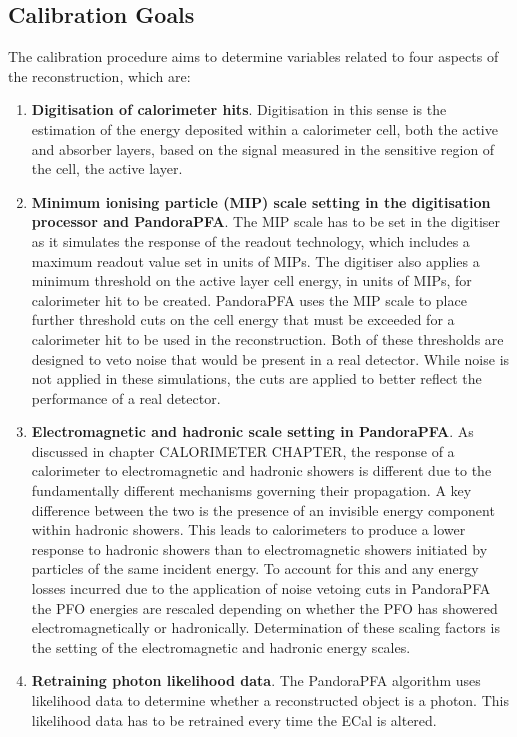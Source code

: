 
\subsection{Calibration Goals}
The calibration procedure aims to determine variables related to four aspects of the reconstruction, which are:

\begin{enumerate}
\item \textbf{Digitisation of calorimeter hits}.  Digitisation in this sense is the estimation of the energy deposited within a calorimeter cell, both the active and absorber layers, based on the signal measured in the sensitive region of the cell, the active layer.  
\item \textbf{Minimum ionising particle (MIP) scale setting in the digitisation processor and PandoraPFA}.  The MIP scale has to be set in the digitiser as it simulates the response of the readout technology, which includes a maximum readout value set in units of MIPs.  The digitiser also applies a minimum threshold on the active layer cell energy, in units of MIPs, for calorimeter hit to be created.  PandoraPFA uses the MIP scale to place further threshold cuts on the cell energy that must be exceeded for a calorimeter hit to be used in the reconstruction.  Both of these thresholds are designed to veto noise that would be present in a real detector.  While noise is not applied in these simulations, the cuts are applied to better reflect the performance of a real detector. 
\item \textbf{Electromagnetic and hadronic scale setting in PandoraPFA}.  As discussed in chapter CALORIMETER CHAPTER, the response of a calorimeter to electromagnetic and hadronic showers is different due to the fundamentally different mechanisms governing their propagation.  A key difference between the two is the presence of an invisible energy component within hadronic showers.  This leads to calorimeters to produce a lower response to hadronic showers than to electromagnetic showers initiated by particles of the same incident energy.  To account for this and any energy losses incurred due to the application of noise vetoing cuts in PandoraPFA the PFO energies are rescaled depending on whether the PFO has showered electromagnetically or hadronically.  Determination of these scaling factors is the setting of the electromagnetic and hadronic energy scales.  
\item \textbf{Retraining photon likelihood data}.  The PandoraPFA algorithm uses likelihood data to determine whether a reconstructed object is a photon.  This likelihood data has to be retrained every time the ECal is altered.
\end{enumerate}

